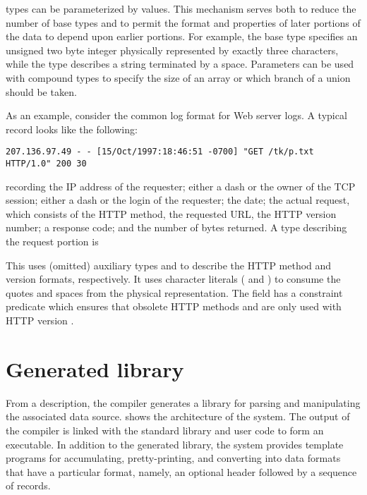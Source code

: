 \pads{} types can be parameterized by values.
This mechanism
serves both to reduce the number of base types and to permit the
format and properties of later portions of the data to depend upon earlier portions.
For example, 
the base type  specifies an unsigned two byte integer
physically represented by exactly three characters, while the type
describes a string terminated by a space.  Parameters can be 
used with compound types to specify the size of an array or which
branch of a union should be taken.


As an example, consider the common log format for Web server logs.  A
typical record looks like the following:
\begin{verbatim}
207.136.97.49 - - [15/Oct/1997:18:46:51 -0700] "GET /tk/p.txt HTTP/1.0" 200 30
\end{verbatim}

\noindent
recording the IP address of the requester; either a dash or the owner
of the TCP session; either a dash or the login of the requester; the
date; the actual request, which consists of the HTTP method, the
requested URL, the HTTP version number; a response code; and the
number of bytes returned.  A \PADSL{} type describing the request
portion is

This \pstruct{} uses (omitted) auxiliary types  and
 to describe
the HTTP method and version formats, respectively.
It uses character literals ( and ) to consume
the quotes and 
spaces from the physical representation. 
The  field has a constraint predicate 
which ensures that obsolete HTTP methods  and  
are only used with HTTP version .

\section{Generated library}

From a description, the \pads{} compiler generates a \C{} library
for parsing and manipulating the associated data source.  
 shows the architecture of the \pads{}
system.  The output of the \pads{} compiler is linked with the \pads{}
standard library and user code to form an executable.
In addition to the generated library,
the \pads{} system provides template programs for accumulating, pretty-printing, and converting into \xml{} data formats that have a particular format, namely, an optional header followed by a sequence of records.

